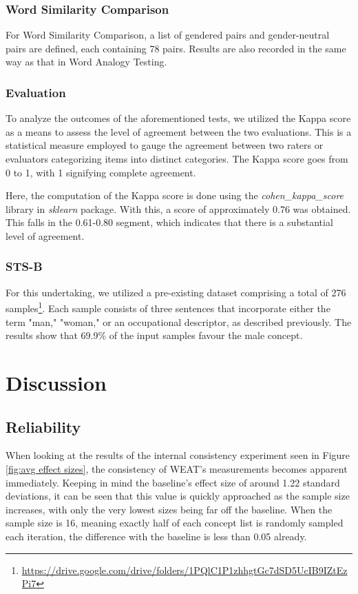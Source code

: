\documentclass[11pt]{article}
\begin{document}
\subsubsection{Word Similarity Comparison}
For Word Similarity Comparison, a list of gendered pairs and gender-neutral pairs are defined, each containing 78 pairs. Results are also recorded in the same way as that in Word Analogy Testing. 

\subsubsection{Evaluation}
To analyze the outcomes of the aforementioned tests, we utilized the Kappa score as a means to assess the level of agreement between the two evaluations. This is a statistical measure employed to gauge the agreement between two raters or evaluators categorizing items into distinct categories. The Kappa score goes from 0 to 1, with 1 signifying complete agreement.

Here, the computation of the Kappa score is done using the \textit{cohen\_kappa\_score} library in \textit{sklearn} package. With this, a score of approximately 0.76 was obtained. This falls in the 0.61-0.80 segment, which indicates that there is a substantial level of agreement.  

\subsubsection{STS-B}
For this undertaking, we utilized a pre-existing dataset comprising a total of 276 samples\footnote{\url{https://drive.google.com/drive/folders/1PQlC1P1zhhgtGc7dSD5UcIB9IZtEzPi7}}. Each sample consists of three sentences that incorporate either the term "man," "woman," or an occupational descriptor, as described previously. The results show that 69.9\% of the input samples favour the male concept.

\section{Discussion}
\subsection{Reliability}
When looking at the results of the internal consistency experiment seen in Figure \ref{fig:avg effect sizes}, the consistency of WEAT's measurements becomes apparent immediately. Keeping in mind the baseline's effect size of around 1.22 standard deviations, it can be seen that this value is quickly approached as the sample size increases, with only the very lowest sizes being far off the baseline. When the sample size is 16, meaning exactly half of each concept list is randomly sampled each iteration, the difference with the baseline is less than 0.05 already.
\end{document}
